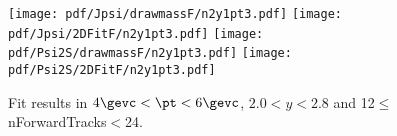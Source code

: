 \begin{figure}[H]
\begin{center}
\texttt{[image: pdf/Jpsi/drawmassF/n2y1pt3.pdf]}
\texttt{[image: pdf/Jpsi/2DFitF/n2y1pt3.pdf]}
\vspace*{-0.5cm}
\texttt{[image: pdf/Psi2S/drawmassF/n2y1pt3.pdf]}
\texttt{[image: pdf/Psi2S/2DFitF/n2y1pt3.pdf]}
\vspace*{-0.5cm}
\end{center}
\caption{Fit results in $4\gevc<\pt<6\gevc$, $2.0<y<2.8$ and 12$\leq$nForwardTracks$<$24.}
\label{Fitn2y1pt3}
\end{figure}
